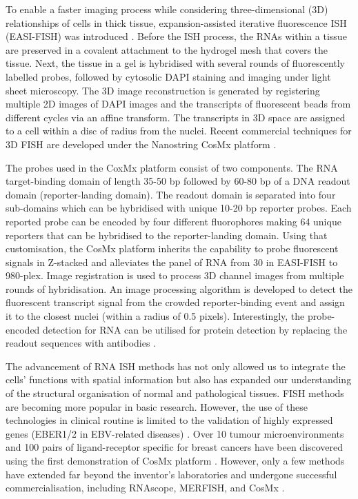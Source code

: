 To enable a faster imaging process while considering three-dimensional (3D) relationships of cells in thick tissue, expansion-assisted iterative fluorescence ISH (EASI-FISH) was introduced \cite{wang2021easi, borm2022scalable}. Before the ISH process, the RNAs within a tissue are preserved in a covalent attachment to the hydrogel mesh that covers the tissue. Next, the tissue in a gel is hybridised with several rounds of fluorescently labelled probes, followed by cytosolic DAPI staining and imaging under light sheet microscopy. The 3D image reconstruction is generated by registering multiple 2D images of DAPI images and the transcripts of fluorescent beads from different cycles via an affine transform. The transcripts in 3D space are assigned to a cell within a disc of radius from the nuclei. Recent commercial techniques for 3D FISH are developed under the Nanostring CosMx platform \cite{he2022high}.  

The probes used in the CoxMx platform consist of two components. The RNA target-binding domain of length 35-50 bp followed by 60-80 bp of a DNA readout domain (reporter-landing domain). The readout domain is separated into four sub-domains which can be hybridised with unique 10-20 bp reporter probes. Each reported probe can be encoded by four different fluorophores making 64 unique reporters that can be hybridised to the reporter-landing domain. Using that customisation, the CosMx platform inherits the capability to probe fluorescent signals in Z-stacked and alleviates the panel of RNA from 30 in EASI-FISH to 980-plex. Image registration is used to process 3D channel images from multiple rounds of hybridisation. An image processing algorithm is developed to detect the fluorescent transcript signal from the crowded reporter-binding event and assign it to the closest nuclei (within a radius of 0.5 pixels). Interestingly, the probe-encoded detection for RNA can be utilised for protein detection by replacing the readout sequences with antibodies \cite{he2022high}.   

The advancement of RNA ISH methods has not only allowed us to integrate the cells' functions with spatial information but also has expanded our understanding of the structural organisation of normal and pathological tissues. FISH methods are becoming more popular in basic research. However, the use of these technologies in clinical routine is limited to the validation of highly expressed genes (\ie EBER1/2 in EBV-related diseases) \cite{gulley2001molecular}. Over 10 tumour microenvironments  and 100 pairs of ligand-receptor specific for breast cancers have been discovered using the first demonstration of CosMx platform \cite{he2022high}. However, only a few methods have extended far beyond the inventor's laboratories and undergone successful commercialisation, including RNAscope, MERFISH, and CosMx \cite{conrad2022single}. 

